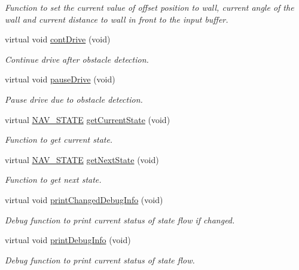 \begin{DoxyCompactItemize}
\begin{DoxyCompactList}\small\item\em Function to set the current value of offset position to wall, current angle of the wall and current distance to wall in front to the input buffer. \end{DoxyCompactList}\item 
virtual void \mbox{\hyperlink{class_c_navigation_abc7e30f72ee2cb33be7b0949efe1cb18}{cont\+Drive}} (void)
\begin{DoxyCompactList}\small\item\em Continue drive after obstacle detection. \end{DoxyCompactList}\item 
virtual void \mbox{\hyperlink{class_c_navigation_a27649dc6324360829d42aea67e88e3ee}{pause\+Drive}} (void)
\begin{DoxyCompactList}\small\item\em Pause drive due to obstacle detection. \end{DoxyCompactList}\item 
virtual \mbox{\hyperlink{class_c_navigation_add9fc966c7604990edf5c2a2e0eba32c}{N\+A\+V\+\_\+\+S\+T\+A\+TE}} \mbox{\hyperlink{class_c_navigation_a42982842952ac5340b54f43a661673f4}{get\+Current\+State}} (void)
\begin{DoxyCompactList}\small\item\em Function to get current state. \end{DoxyCompactList}\item 
virtual \mbox{\hyperlink{class_c_navigation_add9fc966c7604990edf5c2a2e0eba32c}{N\+A\+V\+\_\+\+S\+T\+A\+TE}} \mbox{\hyperlink{class_c_navigation_afef253f37646558a755d956ecf2fc6e9}{get\+Next\+State}} (void)
\begin{DoxyCompactList}\small\item\em Function to get next state. \end{DoxyCompactList}\item 
virtual void \mbox{\hyperlink{class_c_navigation_ac491c77788ba2e953a704b6ad622a665}{print\+Changed\+Debug\+Info}} (void)
\begin{DoxyCompactList}\small\item\em Debug function to print current status of state flow if changed. \end{DoxyCompactList}\item 
virtual void \mbox{\hyperlink{class_c_navigation_a84e320cd8975593ab6f966e8794b2886}{print\+Debug\+Info}} (void)
\begin{DoxyCompactList}\small\item\em Debug function to print current status of state flow. \end{DoxyCompactList}\item 

\end{DoxyCompactItemize}
